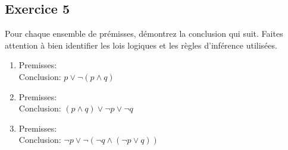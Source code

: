\subsection*{Exercice 5}
Pour chaque ensemble de prémisses, démontrez la conclusion qui suit. Faites attention à bien identifier les
lois logiques et les règles d'inférence utilisées.
\begin{enumerate}
\item Premisses: \\
      Conclusion: $p \vee \neg (p \wedge q)$
\item Premisses: \\
      Conclusion: $(p \wedge q) \vee \neg p \vee \neg q$
\item Premisses: \\
      Conclusion: $\neg p \vee \neg (\neg q \wedge (\neg p \vee q))$
\end{enumerate}

